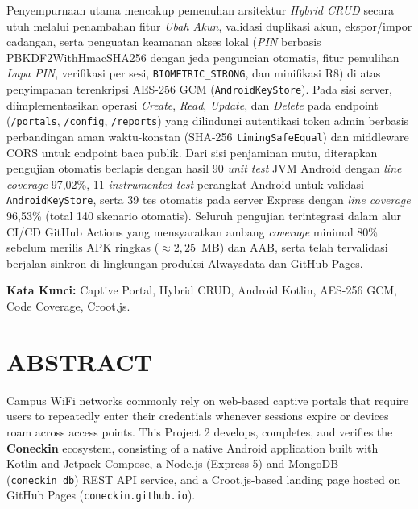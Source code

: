 Penyempurnaan utama mencakup pemenuhan arsitektur \textit{Hybrid CRUD} secara utuh melalui penambahan fitur \textit{Ubah Akun}, validasi duplikasi akun, ekspor/impor cadangan, serta penguatan keamanan akses lokal (\textit{PIN} berbasis PBKDF2WithHmacSHA256 dengan jeda penguncian otomatis, fitur pemulihan \textit{Lupa PIN}, verifikasi per sesi, \texttt{BIOMETRIC\_STRONG}, dan minifikasi R8) di atas penyimpanan terenkripsi AES-256 GCM (\texttt{AndroidKeyStore}). Pada sisi server, diimplementasikan operasi \textit{Create}, \textit{Read}, \textit{Update}, dan \textit{Delete} pada endpoint (\texttt{/portals}, \texttt{/config}, \texttt{/reports}) yang dilindungi autentikasi token admin berbasis perbandingan aman waktu-konstan (SHA-256 \texttt{timingSafeEqual}) dan middleware CORS untuk endpoint baca publik. Dari sisi penjaminan mutu, diterapkan pengujian otomatis berlapis dengan hasil 90 \textit{unit test} JVM Android dengan \textit{line coverage} 97,02\%, 11 \textit{instrumented test} perangkat Android untuk validasi \texttt{AndroidKeyStore}, serta 39 tes otomatis pada server Express dengan \textit{line coverage} 96,53\% (total 140 skenario otomatis). Seluruh pengujian terintegrasi dalam alur CI/CD GitHub Actions yang mensyaratkan ambang \textit{coverage} minimal 80\% sebelum merilis APK ringkas ($\approx 2{,}25$~MB) dan AAB, serta telah tervalidasi berjalan sinkron di lingkungan produksi Alwaysdata dan GitHub Pages.

\vspace{0.5cm}
\noindent\textbf{Kata Kunci:} Captive Portal, Hybrid CRUD, Android Kotlin, AES-256 GCM, Code Coverage, Croot.js.

\clearpage

\chapter*{ABSTRACT}

Campus WiFi networks commonly rely on web-based captive portals that require users to repeatedly enter their credentials whenever sessions expire or devices roam across access points. This Project 2 develops, completes, and verifies the \textbf{Coneckin} ecosystem, consisting of a native Android application built with Kotlin and Jetpack Compose, a Node.js (Express 5) and MongoDB (\texttt{coneckin\_db}) REST API service, and a Croot.js-based landing page hosted on GitHub Pages (\texttt{coneckin.github.io}).

